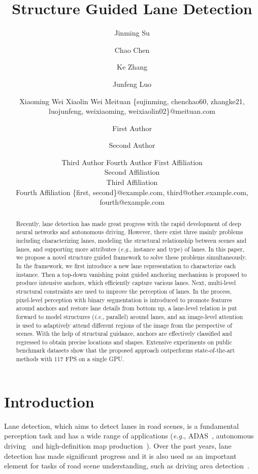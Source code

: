 \documentclass{article}
\title{Structure Guided Lane Detection}
\author{
Jinming Su \and
Chao Chen \and
Ke Zhang \and
Junfeng Luo \and
Xiaoming Wei \And
Xiaolin Wei
\affiliations
Meituan
\emails
\{sujinming, chenchao60, zhangke21, luojunfeng, weixiaoming, weixiaolin02\}@meituan.com
}
\author{
First Author
\and
Second Author\and
Third Author\And
Fourth Author
\affiliations
First Affiliation\\
Second Affiliation\\
Third Affiliation\\
Fourth Affiliation
\emails
\{first, second\}@example.com,
third@other.example.com,
fourth@example.com
}
\def\ie{\emph{i.e.}}
\def\eg{\emph{e.g.}}
\begin{document}
\maketitle

\begin{abstract}
Recently, lane detection has made great progress with the rapid development of deep neural networks and autonomous driving. 
However, there exist three mainly problems including characterizing lanes, modeling the structural relationship between scenes and lanes, and supporting more attributes (\eg, instance and type) of lanes.
In this paper, we propose a novel structure guided framework to solve these problems simultaneously. In the framework, we first introduce a new lane representation to characterize each instance. Then a top-down vanishing point guided anchoring mechanism is proposed to produce intensive anchors, which efficiently capture various lanes. 
Next, multi-level structural constraints are used to improve the perception of lanes. In the process, pixel-level perception with binary segmentation is introduced to promote features around anchors and restore  lane details from bottom up, a lane-level relation is put forward to model structures (\ie, parallel)  around lanes, and an image-level attention is used to adaptively attend different regions of the image from the perspective of scenes. With the help of structural guidance, anchors are effectively classified and regressed to obtain precise locations and shapes.
Extensive experiments on public benchmark datasets show that the proposed approach outperforms state-of-the-art methods with 117 FPS on a single GPU.
\end{abstract}
\let\thefootnote\relax{}

\section{Introduction}
Lane detection, which aims to detect lanes in road scenes, is a fundamental perception task and has a wide range of applications (\eg, ADAS~\cite{butakov2014personalized}, autonomous driving~\cite{chen2017end} and high-definition map production~\cite{homayounfar2019dagmapper}). Over the past years, lane detection has made significant progress and it is also used as an important element for tasks of road scene understanding, such as driving area detection~\cite{yu2020bdd100k}. 
\end{document}
